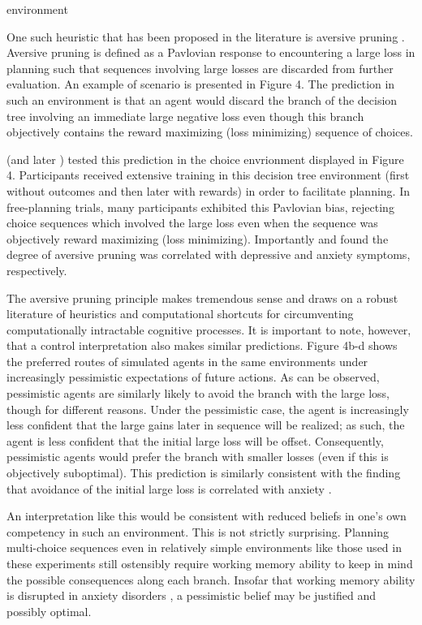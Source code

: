 environment\documentclass[11pt]{article} %
\begin{document}
One such heuristic that has been proposed in the literature is aversive pruning
\citep{Huys2012}. Aversive pruning is defined as a Pavlovian response to encountering
a large loss in planning such that sequences involving large losses are discarded
from further evaluation. An example of scenario is presented in Figure 4. The prediction
in such an environment is that an agent would discard the branch of the decision
tree involving an immediate large negative loss even though this branch objectively
contains the reward maximizing (loss minimizing) sequence of choices.

\cite{Huys2012} (and later \cite{Lally2017}) tested this prediction in the
choice envrionment displayed in Figure 4. Participants received extensive training
in this decision tree environment (first without outcomes and then later with
rewards) in order to facilitate planning. In free-planning trials, many participants
exhibited this Pavlovian bias, rejecting choice sequences which involved the large
loss even when the sequence was objectively reward maximizing (loss minimizing).
Importantly \cite{Huys2012} and \cite{Lally2017} found the degree of aversive
pruning was correlated with depressive and anxiety symptoms, respectively.

The aversive pruning principle makes tremendous sense and draws on a robust literature
of heuristics and computational shortcuts for circumventing computationally intractable
cognitive processes. It is important to note, however, that a control interpretation
also makes similar predictions. Figure 4b-d shows the preferred routes of simulated
agents in the same environments under increasingly pessimistic expectations of
future actions. As can be observed, pessimistic agents are similarly likely to avoid
the branch with the large loss, though for different reasons. Under the pessimistic case,
the agent is increasingly less confident that the large gains later in
sequence will be realized; as such, the agent is less confident that the initial
large loss will be offset. Consequently, pessimistic agents would prefer the branch
with smaller losses (even if this is objectively suboptimal). This prediction
is similarly consistent with the finding that avoidance of the initial large loss
is correlated with anxiety \cite{Lally2017}.

An interpretation like this would be consistent with reduced beliefs in one's
own competency in such an environment. This is not strictly surprising. Planning
multi-choice sequences even in relatively simple environments like those used
in these experiments still ostensibly require working memory ability to keep in
mind the possible consequences along each branch. Insofar that working memory
ability is disrupted in anxiety disorders \citep{Moran2016}, a pessimistic belief
may be justified and possibly optimal.
\end{document}
